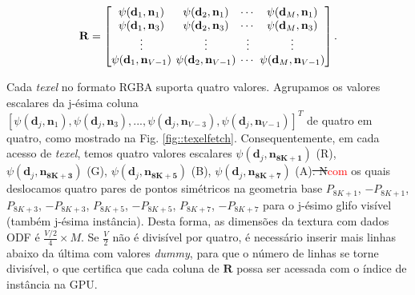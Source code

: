 \begin{equation}
\label{eq::R}
\mathbf{R} = 
\begingroup %
\setlength\arraycolsep{2pt}
\begin{bmatrix} 
    \psi(\mathbf{d}_{1}, \mathbf{n}_1) &
    \psi(\mathbf{d}_{2}, \mathbf{n}_1) & \cdots & 
    \psi(\mathbf{d}_{M}, \mathbf{n}_1)  \\
    
    \psi(\mathbf{d}_{1}, \mathbf{n}_3) &
    \psi(\mathbf{d}_{2}, \mathbf{n}_3) & \cdots & 
    \psi(\mathbf{d}_{M}, \mathbf{n}_{3}) \\ \vdots & \vdots & \vdots & \vdots  \\
    
    \psi(\mathbf{d}_{1}, \mathbf{n}_{V-1}) & 
    \psi(\mathbf{d}_{2}, \mathbf{n}_{V-1}) & \cdots & 
    \psi(\mathbf{d}_{M}, \mathbf{n}_{V-1})
\end{bmatrix}.
\endgroup
\end{equation}

Cada \textit{texel} no formato RGBA suporta quatro valores. Agrupamos os valores escalares da j-ésima coluna $[
\psi(\mathbf{d}_{j}, \mathbf{n}_1),
\psi(\mathbf{d}_{j}, \mathbf{n}_3), ...,
\psi(\mathbf{d}_{j}, \mathbf{n}_{V-3}),
\psi(\mathbf{d}_{j}, \mathbf{n}_{V-1})
]^T$ de quatro em quatro, como mostrado na Fig. \ref{fig::texelfetch}. Consequentemente, em cada acesso de \textit{texel}, temos quatro valores escalares $
\psi(\mathbf{d}_{j}, \mathbf{\mathbf{n}_{8K+1}})$ (R), $
\psi(\mathbf{d}_{j}, \mathbf{\mathbf{n}_{8K+3}})$ (G), $
\psi(\mathbf{d}_{j}, \mathbf{\mathbf{n}_{8K+5}})$ (B), $
\psi(\mathbf{d}_{j}, \mathbf{\mathbf{n}_{8K+7}})$ (A)\sout{. N}\textcolor{red}{com }os quais deslocamos quatro pares de pontos simétricos na geometria base $P_{8K+1}$, $-P_{8K+1}$, $P_{8K+3}$, $-P_{8K+3}$, $P_{8K+5}$, $-P_{8K+5}$, $P_{8K+7}$, $-P_{8K+7}$ para o j-ésimo glifo visível (também j-ésima instância). Desta forma, as dimensões da textura com dados ODF é $ \frac{V/2}{4} \times M$. Se $\frac{V}{2}$ não é divisível por quatro, é necessário inserir mais linhas abaixo da última com valores \textit{dummy}, para que o número de linhas se torne divisível, o que certifica que cada coluna de $\mathbf{R}$ possa ser acessada com o índice de instância na GPU.

